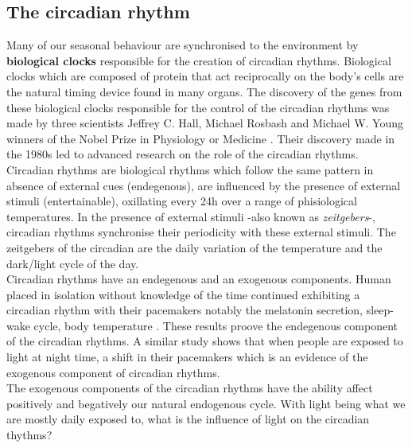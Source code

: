 \subsection{The circadian rhythm}
Many of our seasonal behaviour are synchronised to the environment by \textbf{biological clocks} responsible for the creation of circadian rhythms. Biological clocks which are composed of protein that act reciprocally on the body's cells are the natural timing device found in many organs. The discovery of the genes from these biological clocks responsible for the control of the circadian rhythms was made by three scientists Jeffrey  C.  Hall,  Michael  Rosbash  and Michael W. Young winners of the Nobel Prize in Physiology or Medicine \cite{sc2017}. Their discovery made in the 1980s led to advanced research on the role of the circadian rhythms.\\
Circadian rhythms are biological rhythms which follow the same pattern in absence of external cues (endegenous), are influenced by the presence of external stimuli (entertainable), oxillating every 24h over a range of phisiological temperatures. In the presence of external stimuli -also known as \textit{zeitgebers}-, circadian rhythms synchronise their periodicity with these external stimuli. The zeitgebers of the circadian are the daily variation of the temperature and the dark/light cycle of the day.\\
Circadian rhythms have an endegenous and an exogenous components. Human placed in isolation without knowledge of the time continued exhibiting a circadian rhythm with their pacemakers notably the melatonin secretion, sleep-wake cycle, body temperature \cite{in1996}. These results proove the endegenous component of the circadian rhythms. A similar study shows that when people are exposed to light at night time, a shift in their pacemakers \cite{ea2004} which is an evidence of the exogenous component of circadian rhythms.\\
The exogenous components of the circadian rhythms have the ability affect positively and begatively our natural endogenous cycle. With light being what we are mostly daily exposed to, what is the influence of light on the circadian thythms? 

